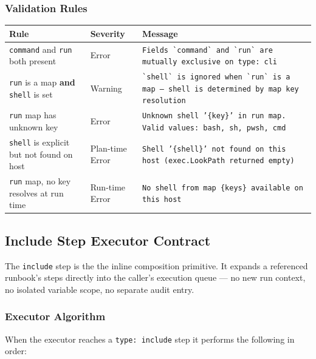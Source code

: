 \subsubsection*{Validation Rules}

\begin{center}
\begin{tabular}{|p{5.5cm}|l|p{6cm}|}
\hline
\textbf{Rule} & \textbf{Severity} & \textbf{Message} \\
\hline
\texttt{command} and \texttt{run} both present & Error &
  \texttt{Fields \`{}command\`{} and \`{}run\`{} are mutually exclusive on type: cli} \\
\hline
\texttt{run} is a map \textbf{and} \texttt{shell} is set & Warning &
  \texttt{\`{}shell\`{} is ignored when \`{}run\`{} is a map — shell is determined by
  map key resolution} \\
\hline
\texttt{run} map has unknown key & Error &
  \texttt{Unknown shell '\{key\}' in run map. Valid values: bash, sh, pwsh, cmd} \\
\hline
\texttt{shell} is explicit but not found on host & Plan-time Error &
  \texttt{Shell '\{shell\}' not found on this host (exec.LookPath returned empty)} \\
\hline
\texttt{run} map, no key resolves at run time & Run-time Error &
  \texttt{No shell from map \{keys\} available on this host} \\
\hline
\end{tabular}
\end{center}

\subsection{Include Step Executor Contract}
\label{sec:include_executor_contract}

The \texttt{include} step is the the inline composition primitive. It expands a referenced
runbook's steps directly into the caller's execution queue — no new run context, no isolated
variable scope, no separate audit entry.

\subsubsection*{Executor Algorithm}

When the executor reaches a \texttt{type: include} step it performs the following in order:

